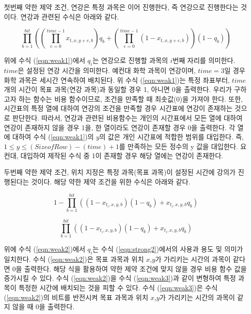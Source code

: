 \documentclass[12pt,a4paper]{article}
\begin{document}
    첫번째 약한 제약 조건, 연강은 특정 과목은 이어 진행한다, 즉 연강으로 진행한다는 것이다. 연강과 관련된 수식은 아래와 같다. 

    \begin{equation}\label{eqn:weak1}
        \prod_{b=1}^{bit} \left( \left( \prod_{e=0}^{time-1}x_{t,x,y+e,b} \right) q_{b}+\left ( \prod_{e=0}^{time-1} (1-x_{t,x,y+e,b}) \right) (1-q_{b}) \right ) 
    \end{equation}

    위에 수식 (\ref{eqn:weak1})에서 $q_{i}$는 연강으로 진행할 과목의 $i$번째 자리를 의미한다. $time$은 설정된 연강 시간을 의미한다. 예컨대 화학 과목이 연강이며, $time=3$일 경우 화학 과목은 세시간 연속하여 배치된다. 위 수식 (\ref{eqn:weak1})는 특정 좌표부터, $time$개의 시간이 목표 과목(연강 과목)과 동일할 경우 1, 아니면 0을 출력한다. 우리가 구하고자 하는 함수는 비용 함수이므로, 조건을 만족할 때 최솟값(0)을 가져야 한다. 또한, 시간표의 특정 열에 대하여 연강의 조건을 만족할 경우 시간표에 연강이 존재하는 것으로 판단한다. 따라서, 연강과 관련된 비용함수는 개인의 시간표에서 모든 열에 대하여 연강이 존재하지 않을 경우 1을, 한 열이라도 연강이 존재할 경우 0을 출력한다. 각 열에 대하여 수식 (\ref{eqn:weak1})의 $y$의 값은 개인 시간표에 적합한 범위를 대입한다. 즉, $1 \leq y \leq (Size of Row)-(time)+1$를 만족하는 모든 정수의 y 값을 대입한다. 요컨대, 대입하여 제작된 수식 중 1이 존재할 경우 해당 열에는 연강이 존재한다.

    두번째 약한 제약 조건, 위치 지정은 특정 과목(목표 과목)이 설정된 시간에 강의가 진행된다는 것이다. 해당 약한 제약 조건을 위한 수식은 아래와 같다.

    \begin{equation}\label{eqn:weak2}
        1- \prod_{b=1}^{bit}\left ( (1-x_{t_{i},x,y,b} )(1-q_{b} )+x_{t_{i},x,y,b} q_{b} \right ) 
    \end{equation}

    \begin{equation}\label{eqn:weak3}
        \prod_{b=1}^{bit}\left ( (1-x_{t_{i},x,y,b} )(1-q_{b} )+x_{t_{i},x,y,b} q_{b} \right ) 
    \end{equation}

    위에 수식 (\ref{eqn:weak2})에서 $q_{i}$는 수식 (\ref{eqn:strong2})에서의 사용과 용도 및 의미가 일치한다. 수식 (\ref{eqn:weak2})은 목표 과목과 위치 $x$,$y$가 가리키는 시간의 과목이 같다면 0을 출력한다. 해당 식을 활용하여 약한 제약 조건에 맞지 않을 경우 비용 함수 값을 증가시킬 수 있다. 수식 (\ref{eqn:weak2})을 수식 (\ref{eqn:weak3})과 같이 변형하여 특정 과목이 특정한 시간에 배치되는 것을 피할 수 있다. 수식 (\ref{eqn:weak3})은 수식 (\ref{eqn:weak2})의 비트를 반전시켜 목표 과목과 위치 $x$,$y$가 가리키는 시간의 과목이 같지 않을 때 0을 출력한다.
\end{document}
